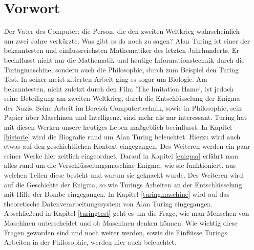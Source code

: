 \section{Vorwort}
Der Vater des Computer; die Person, die den zweiten Weltkrieg wahrscheinlich um zwei Jahre verkürzte. Was gibt es da noch zu sagen? Alan Turing ist einer der bekanntesten und einflussreichsten Mathematiker des letzten Jahrhunderts. Er beeinflusst nicht nur die Mathematik und heutige Informationstechnik durch die Turingmaschine, sondern auch die Philosophie, durch zum Beispiel den Turing Test. In seiner meist zitierten Arbeit ging es sogar um Biologie. Am bekanntesten, nicht zuletzt durch den Film 'The Imitation Hame', ist jedoch seine Beteiligung am zweiten Weltkrieg, durch die Entschlüsselung der Enigma der Nazis. Seine Arbeit im Bereich Computertechnik, sowie in Philosophie, sein Papier über Maschinen und Intelligenz, sind mehr als nur interessant. Turing hat mit diesen Werken unsere heutiges Leben maßgeblich beeinflusst. In Kapitel \ref{historie} wird die Biografie rund um Alan Turing beleuchtet. Hierzu wird auch etwas auf den geschichtlichen Kontext eingegangen. Des Weiteren werden ein paar seiner Werke hier zeitlich eingeordnet. Darauf in Kapitel \ref{enigma} erfährt man alles rund um die Verschlüsselungsmaschine Enigma, wie sie funktioniert, aus welchen Teilen diese besteht und warum sie geknackt wurde. Des Weiteren wird auf die Geschichte der Enigma, so wie Turings Arbeiten an der Entschlüsselung mit Hilfe der Bombe eingegangen. In Kapitel \ref{turingmaschine} wird auf das theoretische Datenverarbeitungssystem von Alan Turing eingegangen. Abschließend in Kapitel \ref{turingtest} geht es um die Frage, wie man Menschen von Maschinen unterscheidet und ob Maschinen denken können. Wie wichtig diese Fragen geworden sind und noch weiter werden, sowie die Einflüsse Turings Arbeiten in der Philosophie, werden hier auch beleuchtet.